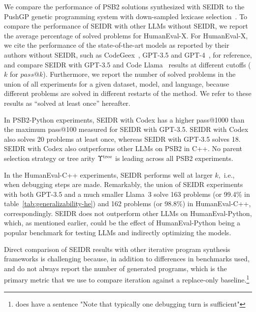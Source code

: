 We compare the performance of PSB2 solutions synthesized with SEIDR to the PushGP genetic programming system with down-sampled lexicase selection~\cite{helmuth2022:problemsolving}. 
To compare the performance of SEIDR with other LLMs without SEIDR, we report the average percentage of solved problems for HumanEval-X. 
For HumanEval-X, we cite the performance of the state-of-the-art models as reported by their authors without SEIDR, such as CodeGeex~\cite{zheng2023:codegeex}, GPT-3.5 and GPT-4~\cite{achiamGpt4TechnicalReport2023}, for reference, and compare SEIDR with GPT-3.5 and Code Llama~\cite{roziereCodeLlamaOpen2024} results at different cutoffs ($k$ for $pass@k$).
Furthermore, we report the number of solved problems in the union of all experiments for a given dataset, model, and language, because different problems are solved in different restarts of the method. 
We refer to these results as ``solved at least once'' hereafter.

In PSB2-Python experiments, SEIDR with Codex has a higher pass@1000 than the maximum pass@100 measured for SEIDR with GPT-3.5. SEIDR with Codex also solves 20 problems at least once, whereas SEIDR with GPT-3.5 solves 18.
SEIDR with Codex also outperforms other LLMs on PSB2 in C++.
No parent selection strategy or tree arity $\Upsilon^\text{tree}$ is leading across all PSB2 experiments. 

In the HumanEval-C++ experiments, SEIDR performs well at larger $k,$ i.e., when debugging steps are made. 
Remarkably, the union of SEIDR experiments with both GPT-3.5 and a much smaller Llama~3 solve 163 problems (or 99.4\% in table~\ref{tab:generalizability-he}) and 162 problems (or 98.8\%) in HumanEval-C++, correspondingly.
SEIDR does not outperform other LLMs on HumanEval-Python, which, as mentioned earlier, could be the effect of HumanEval-Python being a popular benchmark for testing LLMs and indirectly optimizing the models.

Direct comparison of SEIDR results with other iterative program synthesis frameworks is challenging because, in addition to differences in benchmarks used, \cite{jiangSelfEvolveCodeEvolution2023} and \cite{chenTeachingLargeLanguage2023} do not always report the number of generated programs, which is the primary metric that we use to compare iteration against a replace-only baseline.\footnote{\cite{chenTeachingLargeLanguage2023} does have a sentence "Note that typically one debugging turn is sufficient"}


